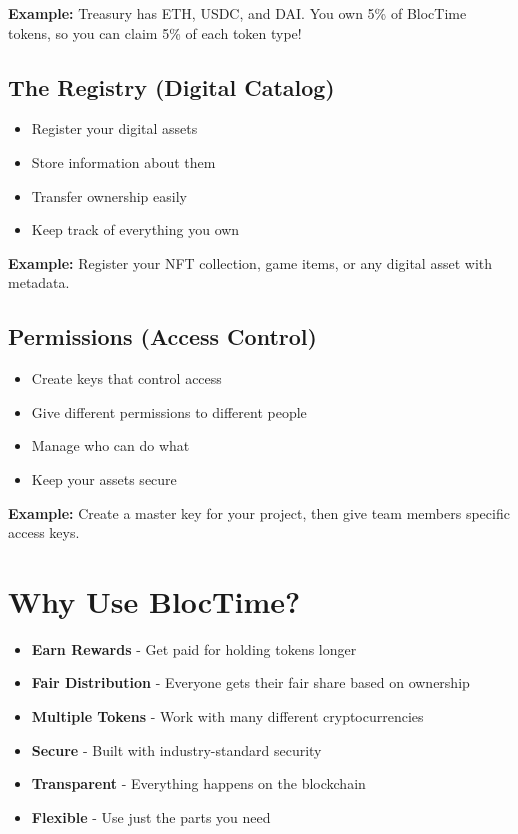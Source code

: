 \documentclass[11pt,a4paper]{article}
\begin{document}
\textbf{Example:} Treasury has ETH, USDC, and DAI. You own 5\% of BlocTime tokens, so you can claim 5\% of each token type!

\subsection{The Registry (Digital Catalog)}
\begin{itemize}
\item Register your digital assets
\item Store information about them
\item Transfer ownership easily
\item Keep track of everything you own
\end{itemize}

\textbf{Example:} Register your NFT collection, game items, or any digital asset with metadata.

\subsection{Permissions (Access Control)}
\begin{itemize}
\item Create keys that control access
\item Give different permissions to different people
\item Manage who can do what
\item Keep your assets secure
\end{itemize}

\textbf{Example:} Create a master key for your project, then give team members specific access keys.

\section{Why Use BlocTime?}

\begin{itemize}[label=\checkmark]
\item \textbf{Earn Rewards} - Get paid for holding tokens longer
\item \textbf{Fair Distribution} - Everyone gets their fair share based on ownership
\item \textbf{Multiple Tokens} - Work with many different cryptocurrencies
\item \textbf{Secure} - Built with industry-standard security
\item \textbf{Transparent} - Everything happens on the blockchain
\item \textbf{Flexible} - Use just the parts you need
\end{itemize}
\end{document}
